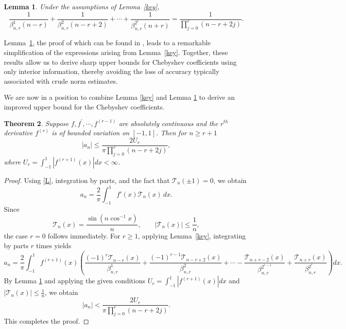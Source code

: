 \documentclass[12pt,a4paper]{article}
\newtheorem{theorem}{Theorem}[section]
\newtheorem{lemma}[theorem]{Lemma}
\begin{document}
\begin{lemma}\label{key2}
    Under the assumptions of Lemma~\ref{key},
    \[
    \frac{1}{\beta^1_{n,r}(n-r)}
    +\frac{1}{\beta^2_{n,r}(n-r+2)}
    +\cdots
    +\frac{1}{\beta^{2^{r}}_{n,r}(n+r)}
    =\frac{1}{\prod_{j=0}^{r}(n-r+2j)}.
    \]
\end{lemma}

Lemma~\ref{key2}, the proof of which can be found in \cite{Ham}, leads to a remarkable simplification of the expressions arising
from Lemma~\ref{key}. Together, these results allow us to derive sharp upper bounds
for Chebyshev coefficients using only interior information, thereby avoiding the
loss of accuracy typically associated with crude norm estimates.

We are now in a position to combine Lemma \ref{key} and Lemma \ref{key2} to derive an improved upper bound for the Chebyshev coefficients.

\begin{theorem}\label{Th1}
    Suppose \(f, f^{\prime},\cdots, f^{(r-1)}\) are absolutely continuous and the \(r^{th}\) derivative \(f^{(r)}\) is of bounded variation on \([-1, 1]\). Then for \(n\geq r+1\)
    \begin{equation}\label{Co}
    \left| a_{n}\right|\leq \frac{2U_r}{\pi\prod_{j=0}^{r}(n-r+2j)},
    \end{equation}
    where \(U_r=\int_{-1}^{1}|f^{(r+1)}(x)|dx<\infty\).
\end{theorem}

\begin{proof}
    Using \eqref{L}, integration by parts, and the fact that $\mathcal{T}_n(\pm1)=0$, we obtain
    \[
    a_n=\frac{2}{\pi}\int_{-1}^{1}f'(x)\mathcal{T}_n(x)\,dx.
    \]
    Since
    \[
    \mathcal{T}_n(x)=\frac{\sin(n\cos^{-1}x)}{n},
    \qquad
    |\mathcal{T}_n(x)|\le \frac{1}{n},
    \]
    the case $r=0$ follows immediately. For $r\ge1$, applying Lemma~\ref{key}, integrating by parts $r$ times yields
    \[
    a_n=\frac{2}{\pi}\int_{-1}^1f^{(r+1)}(x)\left(\frac{(-1)^r\mathcal{T}_{n-r}(x)}{\beta^1_{n,r}}+\frac{(-1)^{r-1}\mathcal{T}_{n-r+2}(x)}{\beta^2_{n,r}}+ \cdots 
    -\frac{\mathcal{T}_{n+r-2}(x)}{\beta^{2^{r-1}}_{n,r}}
    +\frac{\mathcal{T}_{n+r}(x)}{\beta^{2^{r}}_{n,r}}\right)dx.
    \]
    By Lemma \ref{key2} and applying the given conditions \(U_r=\int_{-1}^{1}|f^{(r+1)}(x)|dx\) and \(    |\mathcal{T}_n(x)|\le \frac{1}{n}\), we obtain
    \[
    |a_n|<\frac{2U_r}{\pi \prod_{j=0}^{r}(n-r+2j)}.
    \]
    This completes the proof.
\end{proof}
\end{document}
